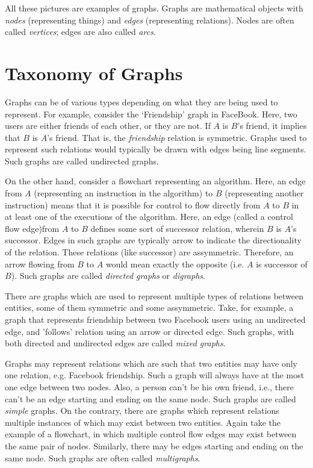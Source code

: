 \documentclass[12pt,a4paper]{article}
\begin{document}
All these pictures are examples of graphs. Graphs are mathematical objects with \emph{nodes} (representing things) and \emph{edges} (representing relations). Nodes are often called \emph{vertices}; edges are also called \emph{arcs}.

\section{Taxonomy of Graphs}
Graphs can be of various types depending on what they are being used to represent. For example, consider the `Friendship' graph in FaceBook. Here, two users are either friends of each other, or they are not. If $A$ is $B$'s friend, it implies that $B$ is $A$'s friend. That is, the \emph{friendship} relation is symmetric. Graphs used to represent such relations would typically be drawn with edges being line segments. Such graphs are called undirected graphs.

On the other hand, consider a flowchart representing an algorithm. Here, an edge from $A$ (representing an instruction in the algorithm) to $B$ (representing another instruction) means that it is possible for control to flow directly from $A$ to $B$ in at least one of the executions of the algorithm. Here, an edge (called a control flow edge)from $A$ to $B$ defines some sort of successor relation, wherein $B$ is $A$'s successor. Edges in such graphs are typically arrow to indicate the directionality of the relation. These relations (like successor) are assymmetric. Therefore, an arrow flowing from $B$ to $A$ would mean exactly the opposite (i.e. $A$ is successor of $B$). Such graphs are called \emph{directed graphs} or \emph{digraphs}.

There are graphs which are used to represent multiple types of relations between entities, some of them symmetric and some assymmetric. Take, for example, a graph that represents friendship between two Facebook users using an undirected edge, and 'follows' relation using an arrow or directed edge. Such graphs, with both directed and undirected edges are called \emph{mixed graphs}.

Graphs may represent relations which are such that two entities may have only one relation, e.g. Facebook friendship. Such a graph will always have at the most one edge between two nodes. Also, a person can't be his own friend, i.e., there can't be an edge starting and ending on the same node. Such graphs are called \emph{simple} graphs. On the contrary, there are graphs which represent relations multiple instances of which may exist between two entities. Again take the example of a flowchart, in which multiple control flow edges may exist between the same pair of nodes. Similarly, there may be edges starting and ending on the same node. Such graphs are often called \emph{multigraphs}.
\end{document}

